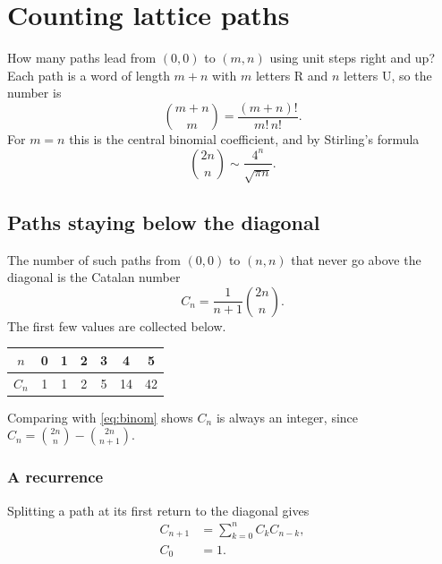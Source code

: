 \documentclass[10pt,letterpaper]{article}
\begin{document}
\section*{Counting lattice paths}
How many paths lead from $(0,0)$ to $(m,n)$ using unit steps right and up? Each path is a word of length $m+n$ with $m$ letters R and $n$ letters U, so the number is
\begin{equation}\label{eq:binom}
\binom{m+n}{m}=\frac{(m+n)!}{m!\,n!}.
\end{equation}
For $m=n$ this is the central binomial coefficient, and by Stirling's formula
\[
\binom{2n}{n}\sim\frac{4^n}{\sqrt{\pi n}}.
\]

\subsection*{Paths staying below the diagonal}
The number of such paths from $(0,0)$ to $(n,n)$ that never go above the diagonal is the Catalan number
\begin{equation}
C_n=\frac{1}{n+1}\binom{2n}{n}.
\end{equation}
The first few values are collected below.
\begin{center}
\begin{tabular}{c|cccccc}
$n$ & 0 & 1 & 2 & 3 & 4 & 5\\ \hline
$C_n$ & 1 & 1 & 2 & 5 & 14 & 42
\end{tabular}
\end{center}
Comparing with \eqref{eq:binom} shows $C_n$ is always an integer, since $C_n=\binom{2n}{n}-\binom{2n}{n+1}$.

\subsubsection*{A recurrence}
Splitting a path at its first return to the diagonal gives
\begin{align*}
C_{n+1}&=\sum_{k=0}^{n}C_kC_{n-k},\\
C_0&=1.
\end{align*}
\end{document}
